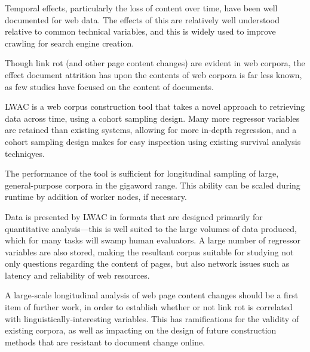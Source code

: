 

Temporal effects, particularly the loss of content over time, have been well documented for web data.  The effects of this are relatively well understood relative to common technical variables, and this is widely used to improve crawling for search engine creation.

Though link rot (and other page content changes) are evident in web corpora, the effect document attrition has upon the contents of web corpora is far less known, as few studies have focused on the content of documents.

LWAC is a web corpus construction tool that takes a novel approach to retrieving data across time, using a cohort sampling design.  Many more regressor variables are retained than existing systems, allowing for more in-depth regression, and a cohort sampling design makes for easy inspection using existing survival analysis techniqyes.

The performance of the tool is sufficient for longitudinal sampling of large, general-purpose corpora in the gigaword range.  This ability can be scaled during runtime by addition of worker nodes, if necessary.

Data is presented by LWAC in formats that are designed primarily for quantitative analysis---this is well suited to the large volumes of data produced, which for many tasks will swamp human evaluators.  A large number of regressor variables are also stored, making the resultant corpus suitable for studying not only questions regarding the content of pages, but also network issues such as latency and reliability of web resources.

A large-scale longitudinal analysis of web page content changes should be a first item of further work, in order to establish whether or not link rot is correlated with linguistically-interesting variables.  This has ramifications for the validity of existing corpora, as well as impacting on the design of future construction methods that are resistant to document change online.





